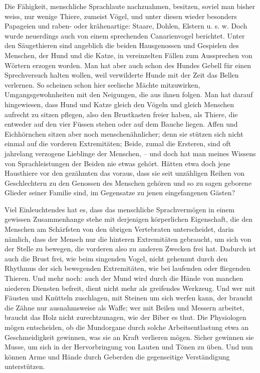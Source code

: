 Die Fähigkeit, menschliche Sprachlaute nachzuahmen, besitzen, soviel man bisher weiss, nur wenige Thiere, zumeist Vögel, und unter diesen wieder besonders Papageien und raben- oder krähenartige: Staare, Dohlen, Elstern u. s. w. Doch wurde neuerdings auch von einem sprechenden Canarienvogel berichtet. Unter den Säugethieren sind angeblich die beiden Hausgenossen und Gespielen des Menschen, der Hund und die Katze, in vereinzelten Fällen zum Aussprechen von Wörtern erzogen worden. Man hat aber auch schon des Hundes Gebell für einen Sprechversuch halten wollen, weil verwilderte Hunde mit der Zeit das Bellen verlernen. So scheinen schon hier seelische Mächte mitzuwirken, Umgangsgewohnheiten mit den Neigungen, die aus ihnen folgen. Man hat darauf hingewiesen, dass Hund und Katze gleich den Vögeln und gleich  Menschen aufrecht zu sitzen pflegen, also den Brustkasten freier haben, als Thiere, die entweder auf den vier Füssen stehen oder auf dem Bauche liegen. Affen und Eichhörnchen sitzen aber noch menschenähnlicher; denn sie stützen sich nicht einmal auf die vorderen Extremitäten; Beide, zumal die Ersteren, sind oft jahrelang verzogene Lieblinge der Menschen, – und doch hat man meines Wissens von Sprachleistungen der Beiden nie etwas gehört. Hätten etwa doch jene Hausthiere vor den gezähmten das voraus, dass sie seit un\-\label{sp.305}zähligen Reihen von Geschlech\-\label{fp.295}tern zu den Genossen des Menschen gehören und so zu sagen geborene Glieder seiner Familie sind, im Gegensatze zu jenen eingefangenen Gästen?

Viel Einleuchtendes hat es, dass das menschliche Sprachvermögen in einem gewissen Zusammenhange stehe mit derjenigen körperlichen Eigenschaft, die den Menschen am Schärfsten von den übrigen Vertebraten unterscheidet, darin nämlich, dass der Mensch nur die hinteren Extremitäten gebraucht, um sich von der Stelle zu bewegen, die vorderen also zu anderen Zwecken frei hat. Dadurch ist auch die Brust frei, wie beim singenden Vogel, nicht gehemmt durch den Rhythmus der sich bewegenden Extremitäten, wie bei laufenden oder fliegenden Thieren. Und mehr noch: auch der Mund wird durch die Hände von manchen niederen Diensten befreit, dient nicht mehr als greifendes Werkzeug. Und wer mit Fäusten und Knütteln zuschlagen, mit Steinen um sich werfen kann, der braucht die Zähne nur ausnahmsweise als Waffe; wer mit Beilen und Messern arbeitet, braucht das Holz nicht zurechtzunagen, wie der Biber es thut. Die Physiologen mögen entscheiden, ob die Mundorgane durch solche Arbeitsentlastung etwa an Geschmeidigkeit gewinnen, was sie an Kraft verlieren mögen. Sicher gewinnen sie Musse, um sich in der Hervorbringung von Lauten und Tönen zu üben. Und nun können Arme und Hände durch Geberden die gegenseitige Verständigung unterstützen.

